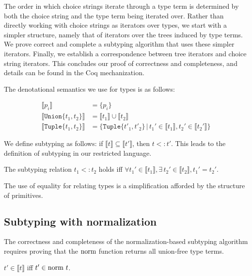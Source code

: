 \documentclass[a4paper,english]{lipics-v2019}
\newcommand{\xt}[1]{\texttt{#1}}
\newcommand{\tuplet}[2]{\xt{Tuple\{}#1,#2\xt{\}}}
\newcommand{\union}[2]{\xt{Union\{}#1,#2\xt{\}}}
\newcommand{\denotes}[1]{\llbracket #1 \rrbracket}
\renewcommand{\c}[1]{\ensuremath{\text{\lstinline{#1}}}\xspace}
\begin{document}
The order in which choice strings iterate through a type term is determined by
both the choice string and the type term being iterated over. Rather than
directly working with choice strings as iterators over types,
we start with a simpler structure, namely that of iterators over the trees
induced by type terms. We prove correct and complete a subtyping algorithm
that uses these simpler iterators. Finally, we establish a correspondence 
between tree iterators and choice string iterators. This concludes our proof
of correctness and completeness, and details can be found in the Coq
mechanization.

The denotational semantics we use for types is as follows:

\vspace{-5mm}
\begin{align*}
\denotes{p_i} &= \{p_i\} \\
\denotes{\union{t_1}{t_2}} &= \denotes{t_1} \cup \denotes{t_2} \\
\denotes{\tuplet{t_1}{t_2}} &= \{\tuplet{t'_1}{t'_2} \,|\, t_1' \in \denotes{t_1},  t_2' \in \denotes{t_2'}\}
\end{align*}
\vspace{-5mm}

\noindent
We define subtyping as follows: if $\denotes{t}\subseteq\denotes{t'}$, then
$t<:t'$.  This leads to the definition of subtyping in our restricted language.

\begin{definition}
 The subtyping relation $t_1 <: t_2$ holds iff $\forall t_1' \in
\denotes{t_1}, \exists\, t_2' \in \denotes{t_2}, t_1' =
t_2'$.\label{dfn:scr}
\end{definition}

\noindent
The use of equality for relating types is a simplification afforded by the
structure of primitives.

\subsection{Subtyping with normalization}

The correctness and completeness of the normalization-based subtyping
algorithm requires proving that the \c{norm}
function returns all union-free type terms.

\begin{lemma}[NF Equivalence]\label{lem:equiv_ndet}
$t' \in \denotes{t}$ iff $t' \in \c{norm}~ t$.
\end{lemma}
\end{document}
